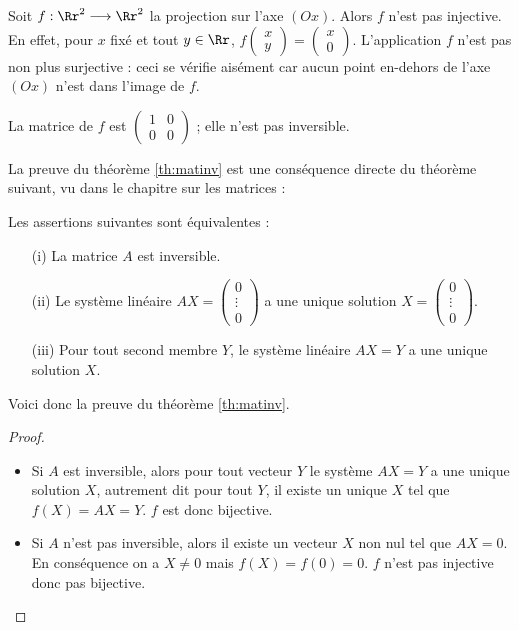 \documentclass[class=report,crop=false]{standalone}
\begin{document}
\begin{exemple}
Soit $f: \Rr^2 \longrightarrow \Rr^2$ la projection sur l'axe $(Ox)$.
Alors $f$ n'est pas injective. En effet, pour $x$ fixé et tout $y\in \Rr$,
$f\left(\begin{smallmatrix}x\\y\end{smallmatrix}\right)
= \left(\begin{smallmatrix}x\\0\end{smallmatrix}\right)$.
L'application $f$ n'est pas non plus surjective :
ceci se vérifie aisément car aucun point en-dehors de l'axe $(Ox)$ n'est dans l'image de $f$.



La matrice de $f$ est
$\left(\begin{smallmatrix}
1 & 0\\
0 & 0\end{smallmatrix}\right)$ ;
elle n'est pas inversible.
\end{exemple}



La preuve du théorème \ref{th:matinv} est une conséquence directe du
théorème suivant, vu dans le chapitre sur les matrices :
\begin{theoreme}
Les assertions suivantes sont équivalentes :
\begin{itemize}
  \item[(i)] La matrice $A$ est inversible.

  \item[(ii)] Le système linéaire $AX=\left(\begin{smallmatrix} 0 \\ \vdots \\ 0\end{smallmatrix}\right)$ a une unique solution
  $X=\left(\begin{smallmatrix} 0 \\ \vdots \\ 0\end{smallmatrix}\right)$.

  \item[(iii)] Pour tout second membre $Y$, le système linéaire $AX=Y$
  a une unique solution $X$.
\end{itemize}
\end{theoreme}

Voici donc la preuve du théorème \ref{th:matinv}.
\begin{proof}
\begin{itemize}
  \item Si $A$ est inversible, alors pour tout vecteur $Y$
  le système $AX=Y$ a une unique solution $X$, autrement dit pour tout
  $Y$, il existe un unique $X$ tel que $f(X)=AX=Y$. $f$ est donc bijective.

  \item Si $A$ n'est pas inversible, alors il existe un vecteur $X$ non nul tel que
  $AX=0$. En conséquence on a $X \neq 0$ mais $f(X)=f(0)=0$. $f$ n'est pas injective donc
  pas bijective.
\end{itemize}
\end{proof}
\end{document}

